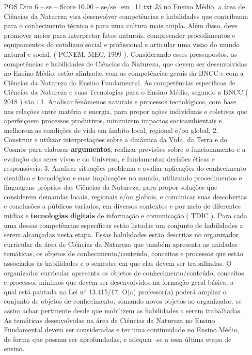 \begin{textsample}{POS Dim 6 – se – Score 10.00 – se/se\_em\_11.txt}
Já no Ensino Médio, a área de Ciências da Natureza visa desenvolver competências e habilidades que contribuam para o conhecimento técnico e para uma cultura mais ampla.
Além disso, deve promover meios para interpretar fatos naturais, compreender procedimentos e equipamentos do cotidiano social e profissional e articular uma visão do mundo natural e social. ( PCNEM, MEC, 1999 ).
Considerando esses pressupostos, as competências e habilidades de Ciências da Natureza, que devem ser desenvolvidas no Ensino Médio, estão alinhadas com as competências gerais da BNCC e com a Ciências da Natureza do Ensino Fundamental.
As competências específicas de Ciências da Natureza e suas Tecnologias para o Ensino Médio, segundo a BNCC ( 2018 ) são : 1.
Analisar fenômenos naturais e processos tecnológicos, com base nas relações entre matéria e energia, para propor ações individuais e coletivas que aperfeiçoem processos produtivos, minimizem impactos socioambientais e melhorem as condições de vida em âmbito local, regional e/ou global. 2.
Construir e utilizar interpretações sobre a dinâmica da Vida, da Terra e do Cosmos para elaborar \textbf{argumentos}, realizar previsões sobre o funcionamento e a evolução dos seres vivos e do Universo, e fundamentar decisões éticas e responsáveis. 3.
Analisar situações-problema e avaliar aplicações do conhecimento científico e tecnológico e suas implicações no mundo, utilizando procedimentos e linguagens próprios das Ciências da Natureza, para propor soluções que considerem demandas locais, regionais e/ou globais, e comunicar suas descobertas e conclusões a públicos variados, em diversos contextos e por meio de diferentes mídias e \textbf{tecnologias} \textbf{digitais} de informação e comunicação ( TDIC ).
Para cada uma dessas competências específicas estão listadas um conjunto de habilidades a serem alcançadas nesta etapa.
Essas habilidades estão descritas no organizador curricular da área de Ciências da Natureza que também apresenta as unidades temáticas, os objetos de conhecimento/conteúdo, conceitos e processos que estão associados às habilidades e o semestre em que elas devem ser trabalhadas.
O organizador curricular apresenta os objetos de conhecimento/conteúdo, conceitos e processos mínimos que devem ser desenvolvidos na formação geral básica, a qual está pautada na Lei nº 13.415/17.
O(a) professor(a) poderá ampliar o conjunto de objetos de conhecimento, somando novos objetos ao organizador, se assim achar pertinente desde que mobilizem as habilidades a serem trabalhadas.
As temáticas desenvolvidas na área de Ciências da Natureza no Ensino Fundamental devem ser consideradas e ter uma continuidade no Ensino Médio, de forma que possam ser aprofundadas, e adequar -se a essa última etapa de ensino.

\end{textsample}
